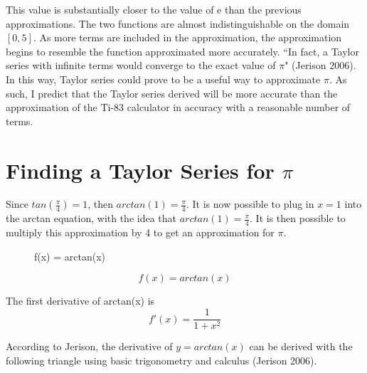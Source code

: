 \documentclass[12pt, titlepage]{article}
\begin{document}
This value is substantially closer to the value of e than the previous approximations. The two functions are almost indistinguishable on the domain \([0,5]\). As more terms are included in the approximation, the approximation begins to resemble the function approximated more accurately. ``In fact, a Taylor series with infinite terms would converge to the exact value of \(\pi\)" (Jerison 2006). In this way, Taylor series could prove to be a useful way to approximate \(\pi\). As such, I predict that the Taylor series derived will be more accurate than the approximation of the Ti-83 calculator in accuracy with a reasonable number of terms.

\section{Finding a Taylor Series for \(\pi\)}
Since \(tan(\frac{\pi}{4}) = 1\), then \(arctan(1)= \frac{\pi}{4}\). It is now possible to plug in \(x = 1\) into the arctan equation, with the idea that \(arctan(1) = \frac{\pi}{4}\). It is then possible to multiply this approximation by 4 to get an approximation for \(\pi\).

\begin{figure}[H]
\centering
    \caption[]{f(x) = arctan(x)}
\end{figure}

\begin{equation*}
  f(x) = arctan(x)
\end{equation*}

The first derivative of arctan(x) is 
\begin{equation*}
f'(x) = \frac{1}{1 + x^{2}}
\end{equation*}

\pagebreak
According to Jerison, the derivative of \(y = arctan(x)\) can be derived with the following triangle using basic trigonometry and calculus (Jerison 2006).
\begin{figure}[H]
\centering
{}
\end{figure}
\end{document}
